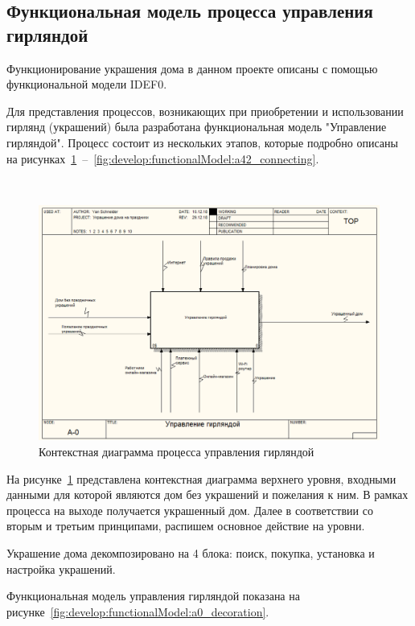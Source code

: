 \subsection{Функциональная модель процесса управления гирляндой}
\label{sec:develop:functionalModel}

Функционирование украшения дома в данном проекте описаны с помощью функциональной модели IDEF0.

Для представления процессов, возникающих при приобретении и использовании гирлянд (украшений) была разработана функциональная модель "Управление гирляндой". Процесс состоит из нескольких этапов, которые подробно описаны на рисунках~\ref{fig:develop:functionalModel:main}~–~\ref{fig:develop:functionalModel:a42_connecting}.

~
\begin{figure}[H]
\centering
	\includegraphics[scale=0.45]{figures/functionalModel/main.jpg}
	\caption{Контекстная диаграмма процесса управления гирляндой}
	\label{fig:develop:functionalModel:main}
\end{figure}

На рисунке~\ref{fig:develop:functionalModel:main} представлена контекстная диаграмма верхнего уровня, входными данными для которой являются дом без украшений и пожелания к ним. В рамках процесса на выходе получается украшенный дом. Далее в соответствии со вторым и третьим принципами, распишем основное действие на уровни.

Украшение дома декомпозировано на 4 блока: поиск, покупка, установка и настройка украшений.

Функциональная модель управления гирляндой показана на рисунке~\ref{fig:develop:functionalModel:a0_decoration}.


